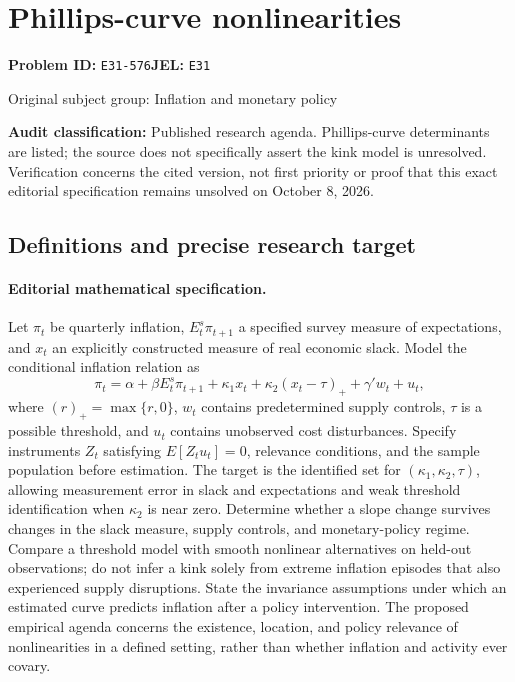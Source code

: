 \documentclass[11pt,a4paper]{article}
\begin{document}
\section*{Phillips-curve nonlinearities}
\textbf{Problem ID:} \texttt{E31-576}\quad \textbf{JEL:} \texttt{E31}\par
\label{problem:OP-0242}
{\sffamily\small\color{muted}Original subject group: Inflation and monetary policy\par}
\label{definitions:problem:30007523}
\textbf{Audit classification:} Published research agenda. Phillips-curve determinants are listed; the source does not specifically assert the kink model is unresolved. Verification concerns the cited version, not first priority or proof that this exact editorial specification remains unsolved on October 8, 2026.
\subsection*{Definitions and precise research target}
\paragraph{Editorial mathematical specification.} Let \(\pi_t\) be quarterly inflation, \(E_t^s\pi_{t+1}\) a specified survey measure of expectations, and \(x_t\) an explicitly constructed measure of real economic slack. Model the conditional inflation relation as
\[
\pi_t=\alpha+\beta E_t^s\pi_{t+1}
+\kappa_1 x_t+\kappa_2(x_t-\tau)_+
+\gamma'w_t+u_t,
\]
where \((r)_+=\max\{r,0\}\), \(w_t\) contains predetermined supply controls, \(\tau\) is a possible threshold, and \(u_t\) contains unobserved cost disturbances. Specify instruments \(Z_t\) satisfying \(E[Z_tu_t]=0\), relevance conditions, and the sample population before estimation.
The target is the identified set for \((\kappa_1,\kappa_2,\tau)\), allowing measurement error in slack and expectations and weak threshold identification when \(\kappa_2\) is near zero. Determine whether a slope change survives changes in the slack measure, supply controls, and monetary-policy regime. Compare a threshold model with smooth nonlinear alternatives on held-out observations; do not infer a kink solely from extreme inflation episodes that also experienced supply disruptions. State the invariance assumptions under which an estimated curve predicts inflation after a policy intervention. The proposed empirical agenda concerns the existence, location, and policy relevance of nonlinearities in a defined setting, rather than whether inflation and activity ever covary.
\end{document}
